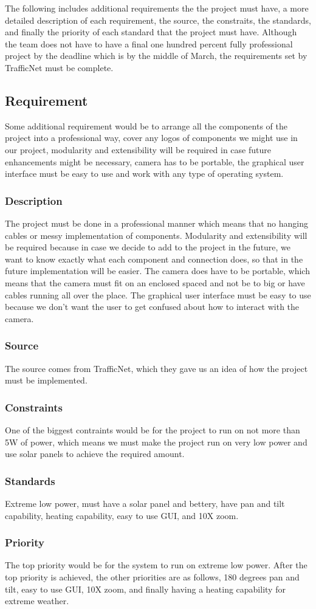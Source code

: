 The following includes additional requirements the the project must have, a more detailed description of each requirement, the source, the constraits, the standards, and finally the priority of each standard that the project must have. Although the team does not have to have a final one hundred percent fully professional project by the deadline which is by the middle of March, the requirements set by TrafficNet must be complete.

\subsection{Requirement}
Some additional requirement would be to arrange all the components of the project into a professional way, cover any logos of components we might use in our project, modularity and extensibility will be required in case future enhancements might be necessary, camera has to be portable, the graphical user interface must be easy to use and work with any type of operating system.
\subsubsection{Description}
The project must be done in a professional manner which means that no hanging cables or messy implementation of components. Modularity and extensibility will be required because in case we decide to add to the project in the future, we want to know exactly what each component and connection does, so that in the future implementation will be easier. The camera does have to be portable, which means that the camera must fit on an enclosed spaced and not be to big or have cables running all over the place. The graphical user interface must be easy to use because we don't want the user to get confused about how to interact with the camera.
\subsubsection{Source}
The source comes from TrafficNet, which they gave us an idea of how the project must be implemented.
\subsubsection{Constraints}
One of the biggest contraints would be for the project to run on not more than 5W of power, which means we must make the project run on very low power and use solar panels to achieve the required amount.
\subsubsection{Standards}
Extreme low power, must have a solar panel and bettery, have pan and tilt capability, heating capability,  easy to use GUI, and 10X zoom.
\subsubsection{Priority}
The top priority would be for the system to run on extreme low power. After the top priority is achieved, the other priorities are as follows, 180 degrees pan and tilt, easy to use GUI, 10X zoom, and finally having a heating capability for extreme weather. 
